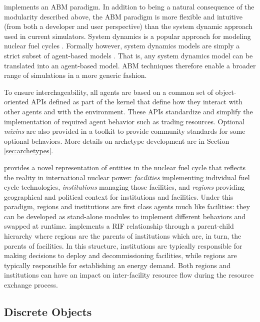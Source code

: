\Cyclus implements an \gls{ABM} paradigm.  In addition to being a natural
consequence of the modularity described above, the \gls{ABM} paradigm is more
flexible and intuitive (from both a developer and user perspective) than the
system dynamic approach used in current simulators.  System dynamics is a
popular approach for modeling nuclear fuel cycles
.
Formally however, system dynamics models are simply a strict subset of
agent-based models .  That is, any system
dynamics model can be translated into an agent-based model.  \gls{ABM}
techniques therefore enable a broader range of simulations in a more generic
fashion.

To ensure interchageability, all agents are based on a common set of
object-oriented \glspl{API} defined as part of the \Cyclus kernel that define
how they interact with other agents and with the environment.  These
\glspl{API} standardize and simplify the implementation of required agent
behavior such as trading resources.  Optional \textit{mixins} are also
provided in a toolkit to provide community standards for some optional
behaviors.  More details on archetype development are in Section
\ref{sec:archetypes}.

\Cyclus provides a novel representation of entities in the nuclear fuel cycle
that reflects the reality in international nuclear power: \textit{facilities}
implementing individual fuel cycle technologies, \textit{institutions}
managing those facilities, and \textit{regions} providing geographical and
political context for institutions and facilities.  Under this paradigm,
regions and institutions are first class agents much like facilities: they can
be developed as stand-alone modules to implement different behaviors and
swapped at runtime.  \Cyclus implements a \gls{RIF} relationship through a
parent-child hierarchy where regions are the parents of institutions which
are, in turn, the parents of facilities.  In this structure, institutions are
typically responsible for making decisions to deploy and decommissioning
facilities, while regions are typically responsible for establishing an energy
demand.  Both regions and institutions can have an impact on inter-facility
resource flow during the resource exchange process.

\subsection{Discrete Objects}

